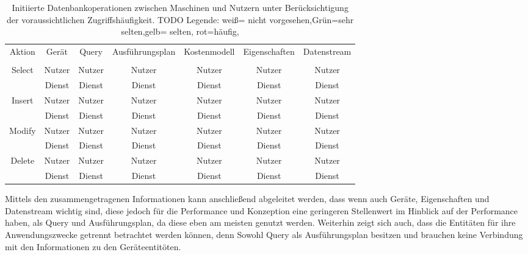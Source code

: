 \begin{table}[ht]
	\centering
	\caption{Initiierte Datenbankoperationen zwischen Maschinen und Nutzern unter Berücksichtigung der voraussichtlichen Zugriffshäufigkeit. TODO Legende: weiß= nicht vorgesehen,Grün=sehr selten,gelb= selten, rot=häufig, }
	\label{3:CRUD_Database}
	\begin{tabular}{|c|c|c|c|c|c|c|}
		\hline
		\multirow{2}{*}{Aktion} & Gerät & Query & Ausführungsplan & Kostenmodell& Eigenschaften & Datenstream \\
		& & & & & &\\
		\hline
		\multirow{2}{*}{Select} & \cellcolor{Yellow}Nutzer& \cellcolor{Red}Nutzer & \cellcolor{Yellow}Nutzer & \cellcolor{Yellow}Nutzer & \cellcolor{Yellow}Nutzer & \cellcolor{Green}Nutzer \\
		& Dienst & Dienst & Dienst & \cellcolor{Yellow}Dienst & \cellcolor{Yellow}Dienst &\cellcolor{Yellow}Dienst   \\
		\hline
		\multirow{2}{*}{Insert} & \cellcolor{Yellow}Nutzer & \cellcolor{Red}Nutzer &  Nutzer & \cellcolor{Yellow}Nutzer & \cellcolor{Yellow}Nutzer & \cellcolor{Green}Nutzer \\
		& Dienst & \cellcolor{Red}Dienst & \cellcolor{Red}Dienst & Dienst & Dienst & Dienst   \\
		\hline
		\multirow{2}{*}{Modify} & \cellcolor{Yellow}Nutzer & Nutzer & Nutzer & \cellcolor{Yellow}Nutzer & \cellcolor{Yellow}Nutzer & \cellcolor{Green}Nutzer \\
		& Dienst& Dienst & Dienst & Dienst & Dienst & Dienst   \\
		\hline
		\multirow{2}{*}{Delete}& Nutzer & Nutzer & Nutzer & Nutzer & Nutzer & Nutzer \\
		& Dienst & Dienst & Dienst & Dienst & Dienst & Dienst   \\
		
		\hline
	\end{tabular}
\end{table}
Mittels den zusammengetragenen Informationen kann anschließend abgeleitet werden, dass wenn auch Geräte, Eigenschaften und Datenstream wichtig sind, diese jedoch für die Performance und Konzeption eine geringeren Stellenwert im Hinblick auf der Performance haben, als Query und Ausführungsplan, da diese eben am meisten genutzt werden. Weiterhin zeigt sich auch, dass die Entitäten für ihre Anwendungszwecke getrennt betrachtet werden können, denn Sowohl Query als Ausführungsplan besitzen und brauchen keine Verbindung mit den Informationen zu den Geräteentitöten.
